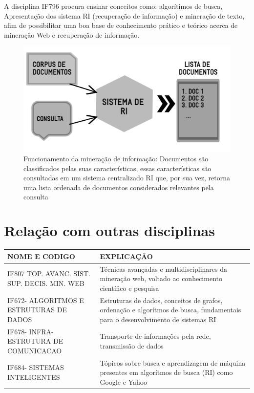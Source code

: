 \documentclass[a4paper,10pt]{article}
\begin{document}
A disciplina IF796 \citep{siteIF796} procura ensinar conceitos como: algorítimos de busca, Apresentação dos sistema RI (recuperação de informação) e mineração de texto, afim de possibilitar uma boa base de conhecimento prático e teórico acerca de mineração Web e recuperação de informação.

\begin{figure}
    \centering
    \includegraphics[scale = 0.5]{sistemaRI.PNG}
    \caption{Funcionamento da mineração de informação: Documentos são classificados pelas suas características, essas características são consultadas em um sistema centralizado RI que, por sua vez, retorna uma lista ordenada de documentos considerados relevantes pela consulta}
    \label{fig:my_label2}
\end{figure}


\section{Relação com outras disciplinas}
\begin{center}
\begin{tabular}{| p{4cm} | p{7cm} |}
\hline
NOME E CODIGO  & EXPLICAÇÃO                                                                    \\\hline
IF807 TOP. AVANC. SIST. SUP. DECIS. MIN. WEB\cite{perfilCurricular} & Técnicas avançadas e multidisciplinares da mineração web, voltado ao conhecimento científico e pesquisa     \\ \hline
IF672- ALGORITMOS E ESTRUTURAS DE DADOS\cite{AED} & Estruturas de dados, conceitos de grafos, ordenação e algorítmos de busca, fundamentais para o desenvolvimento de sistemas RI\\\hline
IF678- INFRA-ESTRUTURA DE COMUNICACAO\cite{IEC}   & Transporte de informações pela rede, transmissão de dados \\ \hline
IF684- SISTEMAS INTELIGENTES\cite{perfilCurricular}   &  Tópicos sobre busca e aprendizagem de máquina presentes em algorítmos de busca (RI) como Google e Yahoo \\ \hline
\end{tabular}
\end{center}



\end{document}
